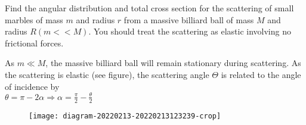 \begin{enumerate}
		\begin{minipage}{\textwidth}
		\item Find the angular distribution and total cross section for the scattering of small marbles of mass $m$ and radius $r$ from a massive billiard ball of mass $M$ and radius $R(m<<M)$.
		You should treat the scattering as elastic involving no frictional forces.
	\end{minipage}
	\begin{answer}
		\begin{minipage}{0.5\textwidth}
		 As $m \ll M$, the massive billiard ball will remain stationary during scattering. As the scattering is elastic (see figure), the scattering angle $\Theta$ is related to the angle of incidence by\\
		$
		\theta=\pi-2 \alpha \Rightarrow \alpha=\frac{\pi}{2}-\frac{\theta}{2}
		$
		\end{minipage}
	\begin{minipage}{0.5\textwidth}
	\begin{figure}[H]
		\centering
		\texttt{[image: diagram-20220213-20220213123239-crop]}
	\end{figure}
	\end{minipage}


\end{answer}
\end{enumerate}
